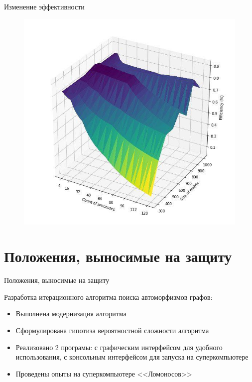 \documentclass{beamer}
\begin{document}
\begin{frame}{Изменение эффективности}

\begin{figure}[ht]
\centering 
    \includegraphics[scale=0.4]{../image/ef.jpg}
\end{figure}

\end{frame}


\section{Положения, выносимые на защиту}
\begin{frame}{Положения, выносимые на защиту}

Разработка итерационного алгоритма поиска автоморфизмов графов:
\begin{itemize}
\item Выполнена модернизация алгоритма
\item Сформулирована гипотиза вероятностной сложности алгоритма
\item Реализовано 2 програмы: с графическим интерфейсом для удобного использования, с консольным интерфейсом для запуска на суперкомпьютере\item Проведены опыты на суперкомпьютере <<Ломоносов>>
\end{itemize}

\end{frame}
\end{document}
